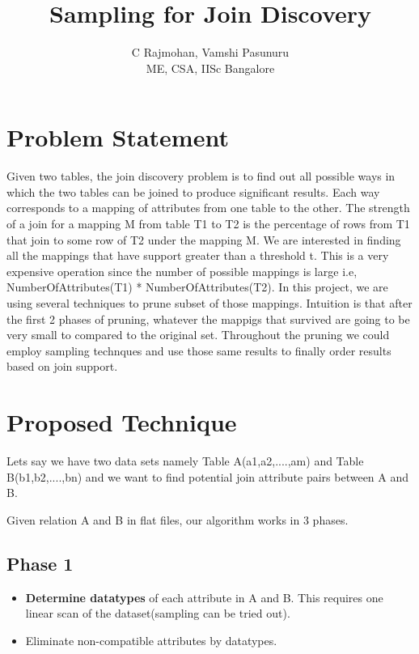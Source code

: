 \documentclass{article}
\begin{document}
\title{\Large \bf Sampling for Join Discovery}

\author{C Rajmohan, Vamshi Pasunuru\\
ME, CSA, IISc Bangalore}
\date{}

\maketitle

\section{Problem Statement}
Given two tables, the join discovery problem is to find out all possible ways in which the two tables can be joined to produce significant results. Each way corresponds to a mapping
of attributes from one table to the other. The strength of a join for a mapping M from table T1 to T2 is the percentage of rows from T1 that join to some row of T2 under the mapping M. We are interested in finding all the mappings that have support greater than a threshold t. This is a very expensive operation since the number of possible mappings is large i.e, NumberOfAttributes(T1) * NumberOfAttributes(T2). In this project, we are using several techniques to prune subset of those mappings. Intuition is that after the first 2 phases of pruning, whatever the mappigs that survived are going to be very small to compared to the original set. Throughout the pruning we could employ sampling technques and use those same results to finally order results based on join support.

\section{Proposed Technique}
Lets say we have two data sets namely Table A(a1,a2,....,am) and Table B(b1,b2,....,bn)
and we want to find potential join attribute pairs between A and B.

Given relation A and B in flat files, our algorithm works in 3 phases.

\subsection{Phase 1}

\begin{itemize}
\item \textbf{Determine datatypes} of each attribute in A and B. This requires one linear scan of the dataset(sampling can be tried out).

\item Eliminate non-compatible attributes by datatypes.
\end{itemize}
\end{document}
